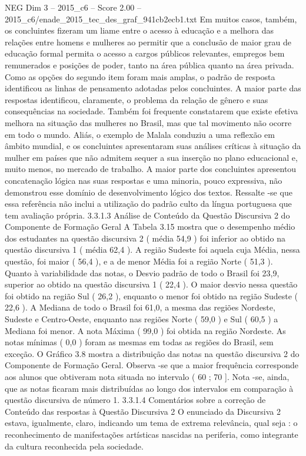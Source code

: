 \begin{textsample}{NEG Dim 3 – 2015\_c6 – Score 2.00 – 2015\_c6/enade\_2015\_tec\_des\_graf\_941cb2ecb1.txt}
Em muitos casos, também, os concluintes fizeram um liame entre o acesso à educação e a melhora das relações entre homens e mulheres ao permitir que a conclusão de maior grau de educação formal permita o acesso a cargos públicos relevantes, empregos bem remunerados e posições de poder, tanto na área pública quanto na área privada.
Como as opções do segundo item foram mais amplas, o padrão de resposta identificou as linhas de pensamento adotadas pelos concluintes.
A maior parte das respostas identificou, claramente, o problema da relação de gênero e suas consequências na sociedade.
Também foi frequente constatarem que existe efetiva melhora na situação das mulheres no Brasil, mas que tal movimento não ocorre em todo o mundo.
Aliás, o exemplo de Malala conduziu a uma reflexão em âmbito mundial, e os concluintes apresentaram suas análises críticas à situação da mulher em países que não admitem sequer a sua inserção no plano educacional e, muito menos, no mercado de trabalho.
A maior parte dos concluintes apresentou concatenação lógica nas suas respostas e uma minoria, pouco expressiva, não demonstrou esse domínio de desenvolvimento lógico dos textos.
Ressalte -se que essa referência não inclui a utilização do padrão culto da língua portuguesa que tem avaliação própria. 3.3.1.3 Análise de Conteúdo da Questão Discursiva 2 do Componente de Formação Geral A Tabela 3.15 mostra que o desempenho médio dos estudantes na questão discursiva 2 ( média 54,9 ) foi inferior ao obtido na questão discursiva 1 ( média 62,4 ).
A região Sudeste foi aquela cuja Média, nessa questão, foi maior ( 56,4 ), e a de menor Média foi a região Norte ( 51,3 ).
Quanto à variabilidade das notas, o Desvio padrão de todo o Brasil foi 23,9, superior ao obtido na questão discursiva 1 ( 22,4 ).
O maior desvio nessa questão foi obtido na região Sul ( 26,2 ), enquanto o menor foi obtido na região Sudeste ( 22,6 ).
A Mediana de todo o Brasil foi 61,0, a mesma das regiões Nordeste, Sudeste e Centro-Oeste, enquanto nas regiões Norte ( 59,0 ) e Sul ( 60,5 ) a Mediana foi menor.
A nota Máxima ( 99,0 ) foi obtida na região Nordeste.
As notas mínimas ( 0,0 ) foram as mesmas em todas as regiões do Brasil, sem exceção.
O Gráfico 3.8 mostra a distribuição das notas na questão discursiva 2 do Componente de Formação Geral.
Observa -se que a maior frequência corresponde aos alunos que obtiveram nota situada no intervalo ( 60 ; 70 ].
Nota -se, ainda, que as notas ficaram mais distribuídas ao longo dos intervalos em comparação à questão discursiva de número 1. 3.3.1.4 Comentários sobre a correção de Conteúdo das respostas à Questão Discursiva 2 O enunciado da Discursiva 2 estava, igualmente, claro, indicando um tema de extrema relevância, qual seja : o reconhecimento de manifestações artísticas nascidas na periferia, como integrante da cultura reconhecida pela sociedade.

\end{textsample}
